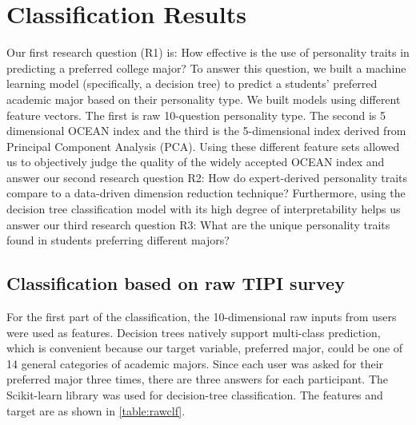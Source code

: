 \documentclass[conference]{IEEEtran}
\begin{document}
\section{Classification Results}\label{sec4}
Our first research question (R1) is: How effective is the use of personality traits
in predicting a preferred college major? To answer this question, we built a machine
learning model (specifically, a decision tree) to predict a students’ preferred academic
major based on their personality type. We built models using different feature vectors.
The first is raw 10-question personality type. The second is 5 dimensional OCEAN
index and the third is the 5-dimensional index derived from Principal Component
Analysis (PCA). Using these different feature sets allowed us to objectively judge the
quality of the widely accepted OCEAN index and answer our second research question
R2: How do expert-derived personality traits compare to a data-driven dimension
reduction technique? Furthermore, using the decision tree classification model with its
high degree of interpretability helps us answer our third research question R3: What are
the unique personality traits found in students preferring different majors?

\subsection{ Classification based on raw TIPI survey}\label{subsec4}
For the first part of the classification, the 10-dimensional raw inputs from users
were used as features. Decision trees natively support multi-class prediction, which is
convenient because our target variable, preferred major, could be one of 14 general
categories of academic majors.
Since each user was asked for their preferred major three times, there are three answers
for each participant. The Scikit-learn \cite{scikit-learn} library was used for
decision-tree classification. The features and target are as shown in \ref{table:rawclf}.
\end{document}
